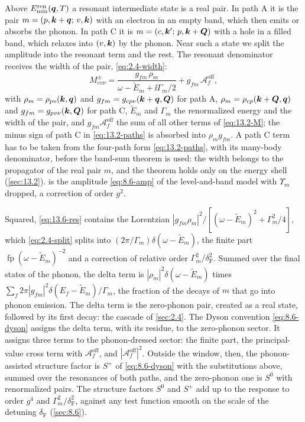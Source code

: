 Above $E^{\mathrm{ren}}_{\mathrm{min}}(\bm{q},T)$ a resonant intermediate state is a real pair. In path A it is the pair $m = (p,\bm{k}+\bm{q};\,v,\bm{k})$ with an electron in an empty band, which then emits or absorbs the phonon. In path C it is $m = (c,\bm{k}';\,p,\bm{k}+\bm{Q})$ with a hole in a filled band, which relaxes into $(v,\bm{k})$ by the phonon. Near such a state we split the amplitude into the resonant term and the rest. The resonant denominator receives the width of the pair, \cref{eq:2.4-width}:
\begin{equation}
  M^\pm_{cv\nu} = \frac{g_{fm}\,\rho_m}{\omega - \tilde E_m + \ii\varGamma_m/2} + g_{fm}\,\mathcal{A}^{\mathrm{off}}_f ,
  \label{eq:13.6-res}
\end{equation}
with $\rho_m = \rho_{pv}(\bm{k},\bm{q})$ and $g_{fm} = g_{cp\nu}(\bm{k}+\bm{q},\bm{Q})$ for path A, $\rho_m = \rho_{cp}(\bm{k}+\bm{Q},\bm{q})$ and $g_{fm} = g_{pv\nu}(\bm{k},\bm{Q})$ for path C, $\tilde E_m$ and $\varGamma_m$ the renormalized energy and the width of the pair, and $g_{fm}\mathcal{A}^{\mathrm{off}}_f$ the sum of all other terms of \cref{eq:13.2-M}; the minus sign of path C in \cref{eq:13.2-paths} is absorbed into $\rho_mg_{fm}$. A path C term has to be taken from the four-path form \cref{eq:13.2-paths}, with its many-body denominator, before the band-sum theorem is used: the width belongs to the propagator of the real pair $m$, and the theorem holds only on the energy shell (\cref{sec:13.2}).  is the amplitude \cref{eq:8.6-amp} of the level-and-band model with $\Upsilon_m$ dropped, a correction of order $g^2$.

Squared, \cref{eq:13.6-res} contains the Lorentzian $|g_{fm}\rho_m|^2/[(\omega - \tilde E_m)^2 + \varGamma_m^2/4]$, which \cref{eq:2.4-split} splits into $(2\pi/\varGamma_m)\delta(\omega - \tilde E_m)$, the finite part $\operatorname{fp}(\omega - \tilde E_m)^{-2}$ and a correction of relative order $\varGamma_m^2/\delta_{\mathrm{F}}^2$. Summed over the final states of the phonon, the delta term is $|\rho_m|^2\delta(\omega - \tilde E_m)$ times $\sum_f2\pi|g_{fm}|^2\delta(E_f - \tilde E_m)/\varGamma_m$, the fraction of the decays of $m$ that go into phonon emission. The delta term is the zero-phonon pair, created as a real state, followed by its first decay: the cascade of \cref{sec:2.4}. The Dyson convention \cref{eq:8.6-dyson} assigns the delta term, with its residue, to the zero-phonon sector. It assigns three terms to the phonon-dressed sector: the finite part, the principal-value cross term with $\mathcal{A}^{\mathrm{off}}_f$, and $|\mathcal{A}^{\mathrm{off}}_f|^2$. Outside the window, then, the phonon-assisted structure factor is $S^+$ of \cref{eq:8.6-dyson} with the substitutions above, summed over the resonances of both paths, and the zero-phonon one is $S^0$ with renormalized pairs. The structure factors $S^0$ and $S^+$ add up to the response to order $g^4$ and $\varGamma_m^2/\delta_{\mathrm{F}}^2$, against any test function smooth on the scale of the detuning $\delta_{\mathrm{F}}$ (\cref{sec:8.6}).

